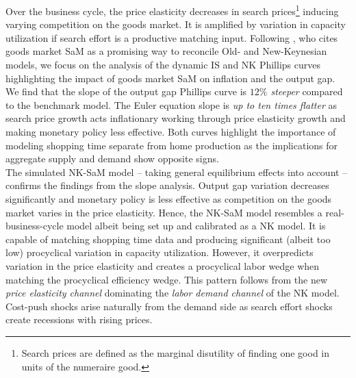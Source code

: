 \documentclass[12pt,3p,authoryear,review]{elsarticle}
\begin{document}
Over the business cycle, the price elasticity decreases in search prices\footnote{Search prices are defined as the marginal disutility of finding one good in units of the numeraire good.} inducing varying competition on the goods market. It is amplified by variation in capacity utilization if search effort is a productive matching input. Following \cite{barro2025old}, who cites goods market SaM as a promising way to reconcile Old- and New-Keynesian models, we focus on the analysis of the dynamic IS and NK Phillips curves highlighting the impact of goods market SaM on inflation and the output gap. We find that the slope of the output gap Phillips curve is \emph{$12\%$ steeper} compared to the benchmark model. The Euler equation slope is \emph{up to ten times flatter} as search price growth acts inflationary working through price elasticity growth and making monetary policy less effective. Both curves highlight the importance of modeling shopping time separate from home production as the implications for aggregate supply and demand show opposite signs.\\%
The simulated NK-SaM model -- taking general equilibrium effects into account -- confirms the findings from the slope analysis. Output gap variation decreases significantly and monetary policy is less effective as competition on the goods market varies in the price elasticity. Hence, the NK-SaM model resembles a real-business-cycle model albeit being set up and calibrated as a NK model. It is capable of matching shopping time data and producing significant (albeit too low) procyclical variation in capacity utilization. However, it overpredicts variation in the price elasticity and creates a procyclical labor wedge when matching the procyclical efficiency wedge. This pattern follows from the new \emph{price elasticity channel} dominating the \emph{labor demand channel} of the NK model. Cost-push shocks arise naturally from the demand side as search effort shocks create recessions with rising prices.\\%
\end{document}
